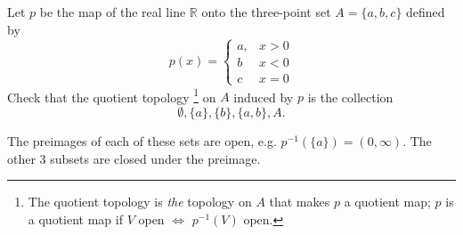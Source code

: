 \documentclass[../../main.tex]{subfiles}
\begin{document}
\begin{problem}[\S22 Ex. 1]
Let $p$ be the map of the real line $\mathbb{R}$ onto the three-point set $A = \{a , b, c\}$ defined by
\begin{equation}
	p(x) = \begin{cases}
		a, & x > 0 \\
		b  & x < 0 \\
		c  & x = 0
	\end{cases}
\end{equation}
Check that the quotient topology
\footnote{The quotient topology is \textit{the} topology on $A$ that makes $p$ a quotient map; $p$ is a quotient map if $V$ open $\Leftrightarrow$ $p^{-1}(V)$ open.}
on $A$ induced by $p$ is the collection
\begin{equation}
	\emptyset, \{a\}, \{b\}, \{a, b\}, A.
\end{equation}
\end{problem}

The preimages of each of these sets are open, e.g. $p^{-1}(\{a\}) = (0, \infty)$.
The other 3 subsets are closed under the preimage.
\end{document}
